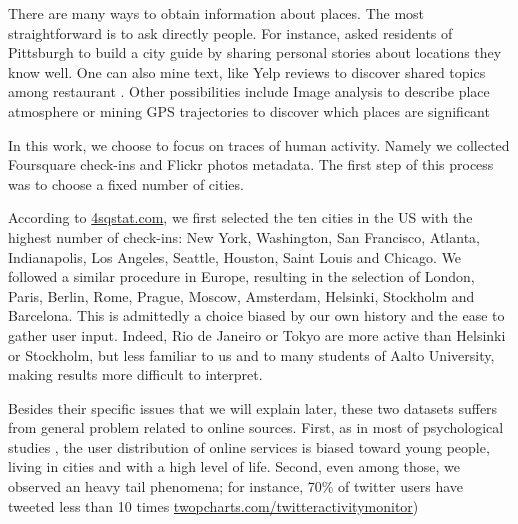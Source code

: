 There are many ways to obtain information about places. The most
straightforward is to ask directly people. For instance, \textcite{Curated14}
asked residents of Pittsburgh to build a city guide by sharing personal
stories about locations they know well. One can also mine text, like Yelp
reviews to discover shared topics among restaurant \autocite{YelpReview14}.
Other possibilities include Image analysis to describe place atmosphere
or mining GPS trajectories to discover which places are significant
\autocite{GPSStay10}

In this work, we choose to focus on traces of human activity. Namely we
collected Foursquare check-ins and Flickr photos metadata. The first step of
this process was to choose a fixed number of cities.

According to \href{http://www.4sqstat.com/}{4sqstat.com}, we first selected
the ten cities in the US with the highest number of check-ins: New York,
Washington, San Francisco, Atlanta, Indianapolis, Los Angeles, Seattle,
Houston, Saint Louis and Chicago. We followed a similar procedure in Europe,
resulting in the selection of London, Paris, Berlin, Rome, Prague, Moscow,
Amsterdam, Helsinki, Stockholm and Barcelona. This is admittedly a choice
biased by our own history and the ease to gather user input. Indeed, Rio de
Janeiro or Tokyo are more active than Helsinki or Stockholm, but less familiar
to us and to many students of Aalto University, making results more difficult
to interpret.

Besides their specific issues that we will explain later, these two datasets
suffers from general problem related to online sources. First, as in most of
psychological studies \autocite{Weird10}, the user distribution of online
services is biased toward young people, living in cities and with a high level
of life. Second, even among those, we observed an heavy tail phenomena; for
instance, 70\% of twitter users have tweeted less than 10 times
\href{http://twopcharts.com/twitteractivitymonitor}%
{\url{twopcharts.com/twitteractivitymonitor}})
